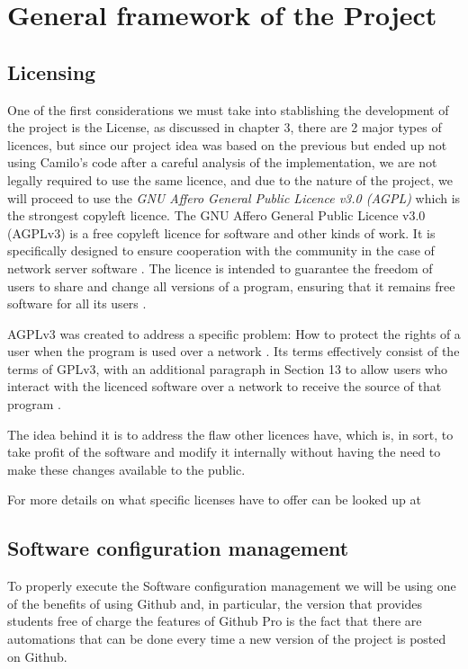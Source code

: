 
\section{General framework of the Project}

\subsection{Licensing}
One of the first considerations we must take into stablishing the development of the project is the License, as discussed in chapter 3, there are 2 major types of licences, but since our project idea was based on the previous but ended up not using Camilo's code after a careful analysis of the implementation, we are not legally required to use the same licence, and due to the nature of the project, we will proceed to use the \textit{GNU Affero General Public Licence v3.0 (AGPL)} which is the strongest copyleft licence. The GNU Affero General Public Licence v3.0 (AGPLv3) is a free copyleft licence for software and other kinds of work. It is specifically designed to ensure cooperation with the community in the case of network server software \cite{fsf1}. The licence is intended to guarantee the freedom of users to share and change all versions of a program, ensuring that it remains free software for all its users \cite{fsf1}.


 AGPLv3 was created to address a specific problem: How to protect the rights of a user when the program is used over a network \cite{fsf2}. Its terms effectively consist of the terms of GPLv3, with an additional paragraph in Section 13 to allow users who interact with the licenced software over a network to receive the source of that program \cite{fsf3}. 


The idea behind it is to address the flaw other licences have, which is, in sort, to take profit of the software and modify it internally without having the need to make these changes available to the public.


For more details on what specific licenses have to offer can be looked up at \cite{choosealicense}\cite{opensourceorg}

\subsection{Software configuration management}
To properly execute the Software configuration management we will be using one of the benefits of using Github and, in particular, the version that provides students free of charge the features of Github Pro is the fact that there are automations that can be done every time a new version of the project is posted on Github.

